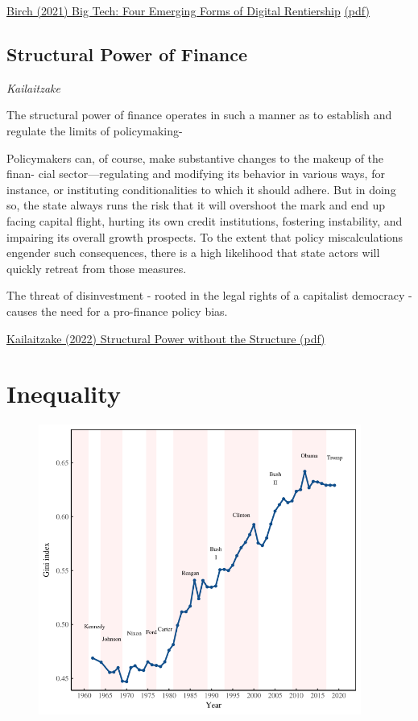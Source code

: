 \documentclass[
]{book}
\begin{document}
\href{https://www.tandfonline.com/doi/full/10.1080/09505431.2021.1932794}{Birch (2021) Big Tech: Four Emerging Forms of Digital Rentiership}
\href{pdf/Birch_2021_Digital_Rentiership.pdf}{(pdf)}

\hypertarget{structural-power-of-finance}{%
\section{Structural Power of Finance}\label{structural-power-of-finance}}

\emph{Kailaitzake}

The structural power of ﬁnance operates in
such a manner as to establish and regulate the limits of policymaking-

Policymakers can, of course, make substantive changes to the makeup of the ﬁnan-
cial sector---regulating and modifying its behavior in various ways, for instance, or
instituting conditionalities to which it should adhere. But in doing so, the state
always runs the risk that it will overshoot the mark and end up facing capital
ﬂight, hurting its own credit institutions, fostering instability, and impairing its
overall growth prospects. To the extent that policy miscalculations engender
such consequences, there is a high likelihood that state actors will quickly
retreat from those measures.

The threat of disinvestment - rooted in the legal rights of a capitalist democracy
- causes the need for a pro-ﬁnance policy bias.

\href{pdf/Kalaitzake_2022_Structural_Power_without_Structure.pdf}{Kailaitzake (2022) Structural Power without the Structure (pdf)}

\hypertarget{inequality}{%
\chapter{Inequality}\label{inequality}}

\includegraphics[width=5in,height=3.75in]{fig/fix_gini_us.png}
\end{document}
